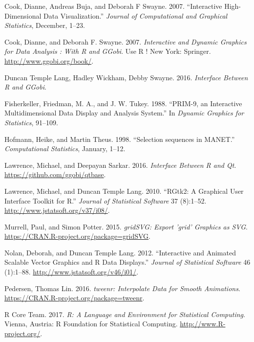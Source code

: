 \documentclass[12pt,]{article}
\theoremstyle{definition}
\theoremstyle{definition}
\theoremstyle{definition}
\theoremstyle{remark}
\begin{document}
\leavevmode\hypertarget{ref-Cook:2007uk}{}%
Cook, Dianne, Andreas Buja, and Deborah F Swayne. 2007. ``Interactive
High-Dimensional Data Visualization.'' \emph{Journal of Computational
and Graphical Statistics}, December, 1--23.

\leavevmode\hypertarget{ref-ggobi:2007}{}%
Cook, Dianne, and Deborah F. Swayne. 2007. \emph{Interactive and Dynamic
Graphics for Data Analysis : With R and GGobi}. Use R ! New York:
Springer. \url{http://www.ggobi.org/book/}.

\leavevmode\hypertarget{ref-rggobi}{}%
Duncan Temple Lang, Hadley Wickham, Debby Swayne. 2016. \emph{Interface
Between R and GGobi}.

\leavevmode\hypertarget{ref-PRIM9}{}%
Fisherkeller, Friedman, M. A., and J. W. Tukey. 1988. ``PRIM-9, an
Interactive Multidimensional Data Display and Analysis System.'' In
\emph{Dynamic Graphics for Statistics}, 91--109.

\leavevmode\hypertarget{ref-sequences}{}%
Hofmann, Heike, and Martin Theus. 1998. ``Selection sequences in
MANET.'' \emph{Computational Statistics}, January, 1--12.

\leavevmode\hypertarget{ref-qtbase}{}%
Lawrence, Michael, and Deepayan Sarkar. 2016. \emph{Interface Between R
and Qt}. \url{https://github.com/ggobi/qtbase}.

\leavevmode\hypertarget{ref-RGtk2}{}%
Lawrence, Michael, and Duncan Temple Lang. 2010. ``RGtk2: A Graphical
User Interface Toolkit for R.'' \emph{Journal of Statistical Software}
37 (8):1--52. \url{http://www.jstatsoft.org/v37/i08/}.

\leavevmode\hypertarget{ref-gridSVG}{}%
Murrell, Paul, and Simon Potter. 2015. \emph{gridSVG: Export 'grid'
Graphics as SVG}. \url{https://CRAN.R-project.org/package=gridSVG}.

\leavevmode\hypertarget{ref-SVGAnnotation}{}%
Nolan, Deborah, and Duncan Temple Lang. 2012. ``Interactive and Animated
Scalable Vector Graphics and R Data Displays.'' \emph{Journal of
Statistical Software} 46 (1):1--88.
\url{http://www.jstatsoft.org/v46/i01/}.

\leavevmode\hypertarget{ref-tweenr}{}%
Pedersen, Thomas Lin. 2016. \emph{tweenr: Interpolate Data for Smooth
Animations}. \url{https://CRAN.R-project.org/package=tweenr}.

\leavevmode\hypertarget{ref-RCore}{}%
R Core Team. 2017. \emph{R: A Language and Environment for Statistical
Computing}. Vienna, Austria: R Foundation for Statistical Computing.
\url{http://www.R-project.org/}.
\end{document}
